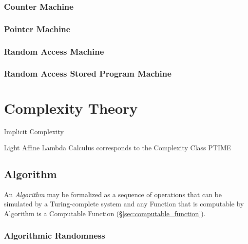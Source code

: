 \subsubsection{Counter Machine}

\subsubsection{Pointer Machine}

\subsubsection{Random Access Machine}

\subsubsection{Random Access Stored Program Machine}



\section{Complexity Theory}\label{sec:complexity_theory}

Implicit Complexity

Light Affine Lambda Calculus corresponds to the Complexity Class PTIME



\subsection{Algorithm}\label{sec:algorithm}

An \emph{Algorithm} may be formalized as a sequence of operations that
can be simulated by a Turing-complete system and any Function that is
computable by Algorithm is a Computable Function
(\S\ref{sec:computable_function}).



\subsubsection{Algorithmic Randomness}\label{sec:algorithmic_randomness}



